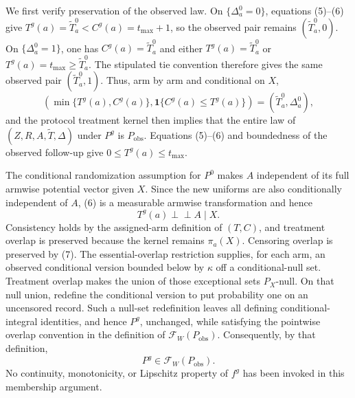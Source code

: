 We first verify preservation of the observed law.  On \(\{\Delta_a^0=0\}\), equations (5)--(6) give \(T^g(a)=\widetilde T_a^0<C^g(a)=t_{\max}+1\), so the observed pair remains \((\widetilde T_a^0,0)\).  On \(\{\Delta_a^0=1\}\), one has \(C^g(a)=\widetilde T_a^0\) and either \(T^g(a)=\widetilde T_a^0\) or \(T^g(a)=t_{\max}\ge\widetilde T_a^0\).  The stipulated tie convention therefore gives the same observed pair \((\widetilde T_a^0,1)\).  Thus, arm by arm and conditional on \(X\),
\[
\left(\min\{T^g(a),C^g(a)\},
\mathbf 1\{C^g(a)\le T^g(a)\}\right)
=(\widetilde T_a^0,\Delta_a^0),
\tag{7}
\]
and the protocol treatment kernel then implies that the entire law of \((Z,R,A,\widetilde T,\Delta)\) under \(P^g\) is \(P_{\mathrm{obs}}\).  Equations (5)--(6) and boundedness of the observed follow-up give \(0\le T^g(a)\le t_{\max}\).

The conditional randomization assumption for \(P^0\) makes \(A\) independent of its full armwise potential vector given \(X\).  Since the new uniforms are also conditionally independent of \(A\), (6) is a measurable armwise transformation and hence
\[
T^g(a)\perp\!\!\!\perp A\mid X.
\tag{8}
\]
Consistency holds by the assigned-arm definition of \((T,C)\), and treatment overlap is preserved because the kernel remains \(\pi_a(X)\).  Censoring overlap is preserved by (7).  The essential-overlap restriction supplies, for each arm, an observed conditional version bounded below by \(\kappa\) off a conditional-null set.  Treatment overlap makes the union of those exceptional sets \(P_X\)-null.  On that null union, redefine the conditional version to put probability one on an uncensored record.  Such a null-set redefinition leaves all defining conditional-integral identities, and hence \(P^g\), unchanged, while satisfying the pointwise overlap convention in the definition of \(\mathcal F_W(P_{\mathrm{obs}})\).  Consequently, by that definition,
\[
P^g\in\mathcal F_W(P_{\mathrm{obs}}).
\tag{9}
\]
No continuity, monotonicity, or Lipschitz property of \(f^g\) has been invoked in this membership argument.

